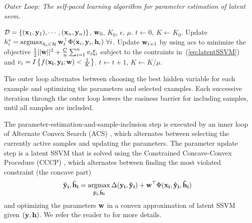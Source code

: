 \documentclass{article}
\newcommand{\mytopcaption}[1]{\caption{\em \footnotesize #1}}
\newcommand{\argmax}{\operatornamewithlimits{argmax}}
\newcommand{\mthb }{\begin{eqnarray*} }
\newcommand{\mthe }{\end {eqnarray*} }
\begin{document}

\begin{algorithm}[h!]
\mytopcaption{Outer Loop: The self-paced learning algorithm for parameter estimation of latent {\sc ssvm}.}
\label{algo:selfPacedLatentSSVM}
\begin{algorithmic}[1]
\INPUT ${\cal D} = \{({\bf x}_1,{\bf y}_1),\cdots,({\bf x}_n,{\bf y}_n)\}$, ${\bf w}_0$, $K_0$, $\epsilon$, $\mu$.
\STATE $t \leftarrow 0$, $K \leftarrow K_0$.
\REPEAT
\STATE Update $h_i^* = \argmax_{h_i \in {\cal H}} {\bf w}_{t}^\top \Phi({\bf x}_i,{\bf y}_i,{\bf h}_i)\ \forall i$.
\STATE Update ${\bf w}_{t+1}$ by using {\sc acs} to minimize the objective
$\frac{1}{2}||{\bf w}||^2 + \frac{C}{n} \sum_{i=1}^n v_i\xi_i$ subject to the contraints in~(\ref{eq:latentSSVM}) and $v_i=I\left\{f({\bf x_i,\bf y_i;\bf w}) < \frac{1}{K}\right\}$.
\STATE $t \leftarrow t + 1$, $K \leftarrow K/\mu$.
\end{algorithmic}
\end{algorithm}

The outer loop alternates between choosing the best hidden variable for each example and optimizing the parameters and selected examples.  Each successive iteration through the outer loop lowers the easiness barrier for including samples, until all samples are included.

The parameter-estimation-and-sample-inclusion step is executed by an inner loop of Alternate Convex Search ({\sc ACS}) \cite{SPL}, which alternates between selecting the currently active samples and updating the parameters.  The parameter update step is a latent SSVM that is solved using the Constrained Concave-Convex Procedure ({\sc CCCP}) \cite{SSVM}, which alternates between finding the most violated constraint (the concave part)
\mthb
{\bf\bar y_i,\bf\bar h_i} = \argmax_{{\bf\hat y_i},{\bf\hat h_i}} \Delta({\bf y_i,\bf\hat y_i})+{\bf w}^\top\Phi(\bf x_i,\bf\hat y_i,\bf\hat h_i)
\mthe
and optimizing the parameters $\bf w$ in a convex approximation of latent SSVM given $(\bf y, \bf h)$.  We refer the reader to \cite{SSVM} for more details.
\end{document}
